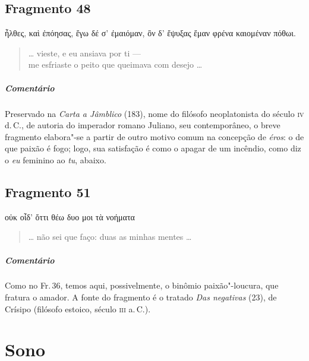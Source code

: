 \section{Fragmento 48}

\begin{gkverse}
ἦλθες, \dagger{}καὶ\dagger{} ἐπόησας, ἔγω δέ σ’ ἐμαιόμαν,
ὂν δ’ ἔψυξας ἔμαν φρένα καιομέναν πόθωι.
\end{gkverse}

\begin{verse}
\ldots{} vieste, e eu ansiava por ti ---\\
me esfriaste o peito que queimava com desejo \ldots{}
\end{verse}

\medskip

{\paragraph{Comentário} Preservado na \emph{Carta a Jâmblico} (183), nome do filósofo neoplatonista do
século \textsc{iv} d.\,C., de autoria do imperador romano Juliano, seu contemporâneo, o
breve fragmento elabora"-se a partir de outro motivo comum na concepção de
\emph{éros}: o de que paixão é fogo; logo, sua satisfação é como o apagar de
um incêndio, como diz o \emph{eu} feminino ao \emph{tu}, abaixo.}

\section{Fragmento 51}

\begin{gkverse}
οὐκ οἶδ’ ὄττι θέω δυο μοι τὰ νοήματα
\end{gkverse}

\begin{verse}
\ldots{} não sei que faço: duas as minhas mentes \ldots{}
\end{verse}

\medskip

\paragraph{Comentário} Como no Fr.\,36, temos aqui, possivelmente, o binômio paixão"-loucura, que fratura o amador. A
fonte do fragmento é o tratado \emph{Das negativas} (23), de Crísipo (filósofo
estoico, século \textsc{iii} a.\,C.). 


\chapter{Sono}

